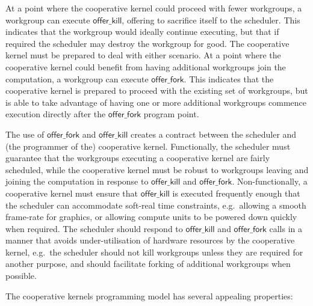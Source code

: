 \documentclass[numbers,nocopyrightspace,10pt]{sigplanconf}
\newcommand{\offerfork}{\mathsf{offer\_fork}}
\newcommand{\offerkill}{\mathsf{offer\_kill}}
\begin{document}
At a point where the cooperative kernel could proceed with fewer
workgroups, a workgroup can execute $\offerkill$, offering to
sacrifice itself to the scheduler.  This indicates that the workgroup
would ideally continue executing, but that if required the
scheduler may destroy the workgroup for good.  The cooperative kernel
must be prepared to deal with either scenario.
%
At a point where the cooperative kernel could benefit from having
additional workgroups join the computation, a workgroup can execute
$\offerfork$.  This indicates that the cooperative
kernel is prepared to proceed with the existing set of workgroups, but
is able to take advantage of having one or more additional workgroups
commence execution directly after the $\offerfork$ program point.

The use of $\offerfork$ and $\offerkill$ creates a contract between
the scheduler and (the programmer of the) cooperative kernel.
Functionally, the
scheduler must guarantee that the workgroups executing a cooperative
kernel are fairly scheduled, while the cooperative kernel must be
robust to workgroups leaving and joining the computation in response
to $\offerkill$ and $\offerfork$.  Non-functionally, a cooperative
kernel must ensure that $\offerkill$ is executed frequently enough
that the scheduler can accommodate soft-real time constraints,
e.g.\ allowing a smooth frame-rate for graphics, or allowing compute
units to be powered down quickly when required.  The scheduler should
respond to $\offerkill$ and $\offerfork$ calls in a manner that avoids
under-utilisation of hardware resources by the cooperative kernel,
e.g.\ the scheduler should not kill workgroups unless they are
required for another purpose, and should facilitate forking of
additional workgroups when possible.

The cooperative kernels programming model has several appealing
properties:
\end{document}
